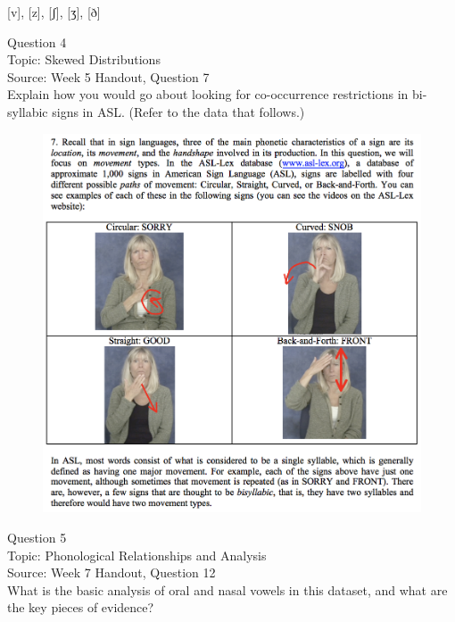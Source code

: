 \documentclass[12pt]{article}
\begin{document}
{[v]}, {[z]}, {[ʃ]}, {[ʒ]}, {[ð]}


\newpage

{\large Question 4}\\

Topic: Skewed Distributions\\
Source: Week 5 Handout, Question 7\\

Explain how you would go about looking for co-occurrence restrictions in bi-syllabic signs in ASL. (Refer to the data that follows.)\\

\begin{figure}[H]
\includegraphics{../images/ASL_movement.png}
\end{figure}

\newpage

{\large Question 5}\\

Topic: Phonological Relationships and Analysis\\
Source: Week 7 Handout, Question 12\\

What is the basic analysis of oral and nasal vowels in this dataset, and what are the key pieces of evidence?\\
\end{document}
